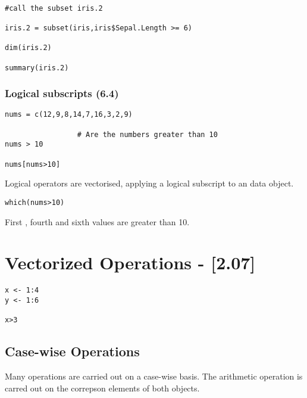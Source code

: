 \documentclass[a4paper,12pt]{article}
\begin{document}
\begin{framed}
\begin{verbatim}

#call the subset iris.2

iris.2 = subset(iris,iris$Sepal.Length >= 6)

dim(iris.2)

summary(iris.2)

\end{verbatim}
\end{framed}

\subsubsection*{Logical subscripts (6.4)}
\begin{framed}
\begin{verbatim}
nums = c(12,9,8,14,7,16,3,2,9)

                 # Are the numbers greater than 10
nums > 10

nums[nums>10]
\end{verbatim}
\end{framed}

Logical operators are vectorised, applying a logical subscript to an data object.

\begin{framed}
\begin{verbatim}
which(nums>10)
\end{verbatim}
\end{framed}

First , fourth and sixth values are greater than 10.
\newpage
\section*{Vectorized Operations - [2.07]}

\begin{framed}
\begin{verbatim}
x <- 1:4
y <- 1:6

x>3
\end{verbatim}
\end{framed}
\subsection*{Case-wise Operations}
Many operations are carried out on a case-wise basis. 
The arithmetic operation is carred out on the correpson elements of both objects.
\end{document}
